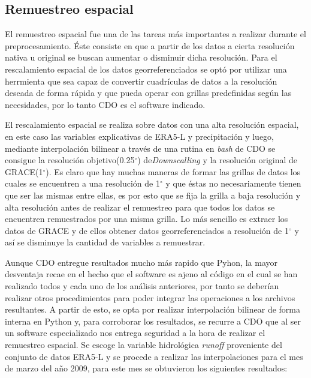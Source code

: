     \subsection{Remuestreo espacial}
    
    El remuestreo espacial fue una de las tareas más importantes a realizar durante el preprocesamiento. Éste consiste en que a partir de los datos a cierta
    resolución nativa u original se buscan aumentar o disminuir dicha resolución. Para el rescalamiento espacial de los datos georreferenciados se optó por utilizar una herrmienta que sea capaz de convertir 
    cuadrículas de datos a la resolución deseada de forma rápida y que pueda operar con grillas predefinidas según las necesidades, por lo tanto CDO es el software indicado. 

    
    El rescalamiento espacial se realiza sobre datos con una alta resolución espacial, en este caso las variables explicativas de ERA5-L y precipitación y luego, mediante interpolación bilinear a través de una rutina en \textit{bash} de CDO se consigue
    la resolución objetivo(0.25$^\circ$) de\textit{Downscalling} y la resolución original de GRACE(1$^\circ$). Es claro que hay muchas maneras de formar las grillas de datos los cuales se encuentren a una resolución de 
    1$^\circ$ y que éstas no necesariamente tienen que ser las mismas entre ellas, es por esto que se fija la grilla a baja resolución y alta resolución antes de realizar el remuestreo
    para que todos los datos se encuentren remuestrados por una misma grilla. Lo más sencillo es extraer los datos de GRACE y de ellos obtener datos georreferenciados a resolución de 1$^\circ$ y así se disminuye la cantidad de
    variables a remuestrar.

    Aunque CDO entregue resultados mucho más rapido que Pyhon, la mayor desventaja recae en el hecho que el software es ajeno al código en el cual se han realizado todos y cada uno de los análisis anteriores, por tanto se deberían realizar otros procedimientos para poder integrar las operaciones a los archivos resultantes.
    A partir de esto, se opta por realizar interpolación bilinear de forma interna en Python y, para corroborar los resultados, se recurre a CDO que al ser un software especializado nos entrega seguridad a la hora de realizar el remuestreo
    espacial. Se escoge la variable hidrológica \textit{runoff} proveniente del conjunto de datos ERA5-L y se procede a realizar las interpolaciones para el mes de marzo del año 2009, para este mes se obtuvieron los siguientes resultados:
    
